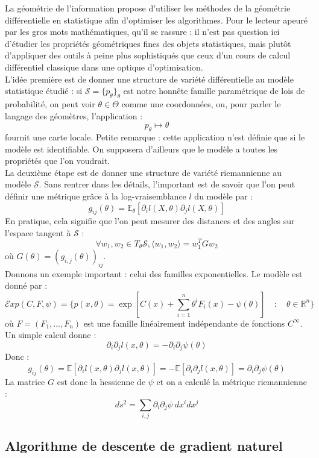 \documentclass{article}
\newcommand{\R}{\mathbb R}
\begin{document}
La géométrie de l'information propose d'utiliser les méthodes de la géométrie différentielle en statistique afin d'optimiser les algorithmes. Pour le lecteur apeuré par les gros mots mathématiques, qu'il se rassure : il n'est pas question ici d'étudier les propriétés géométriques fines des objets statistiques, mais plutôt d'appliquer des outils à peine plus sophistiqués que ceux d'un cours de calcul différentiel classique dans une optique d'optimisation.\\

 L'idée première est de donner une structure de variété différentielle au modèle statistique étudié : si $\mathcal S = \{p_\theta\}_\theta$ est notre honnête famille paramétrique de lois de probabilité, on peut voir $\theta \in \Theta$ comme une coordonnées, ou, pour parler le langage des géomètres, l'application : \[p_\theta \mapsto \theta\] fournit une carte locale. Petite remarque : cette application n'est définie que si le modèle est identifiable. On supposera d'ailleurs que le modèle a toutes les propriétés que l'on voudrait.\\

La deuxième étape est de donner une structure de variété riemannienne au modèle $\mathcal S$. Sans rentrer dans les détails, l'important est de savoir que l'on peut définir une métrique grâce à la log-vraisemblance $l$ du modèle par :
\[g_{ij} (\theta) = \mathbb E_\theta[\partial_i l(X,\theta) \partial_j l(X,\theta)]\]
En pratique, cela signifie que l'on peut mesurer des distances et des angles sur l'espace tangent à $\mathcal S$ : 
\[\forall w_1,w_2 \in T_\theta \mathcal S, \langle w_1 , w_2 \rangle = w_1^T G w_2\] où $G(\theta)=(g_{i,j}(\theta))_{ij}$.\\

Donnons un exemple important : celui des familles exponentielles. Le modèle est donné par :
\[\mathcal{E}xp(C,F,\psi) = \{p(x,\theta)=\exp[C(x)+\sum_{i=1}^n \theta^i F_i(x) -\psi(\theta)] \quad :\quad  \theta \in \R^n\}\]
où $F=(F_1,...,F_n)$ est une famille linéairement indépendante de fonctions $C^\infty$. Un simple calcul donne :
\[\partial_i \partial_j l(x,\theta) =-\partial_i \partial_j \psi(\theta)\]
Donc :
\[g_{ij}(\theta) =\mathbb E[\partial_i l(x,\theta)\partial_j l(x,\theta)]=-\mathbb E[\partial_i\partial_j l(x,\theta)]=\partial_i \partial_j \psi(\theta)\]
La matrice $G$ est donc la hessienne de $\psi$ et on a calculé la métrique riemannienne :
\[ds^2= \sum_{i,j} \partial_i \partial_j \psi \ dx^i dx^j\]

\subsection{Algorithme de descente de gradient naturel}
\end{document}
